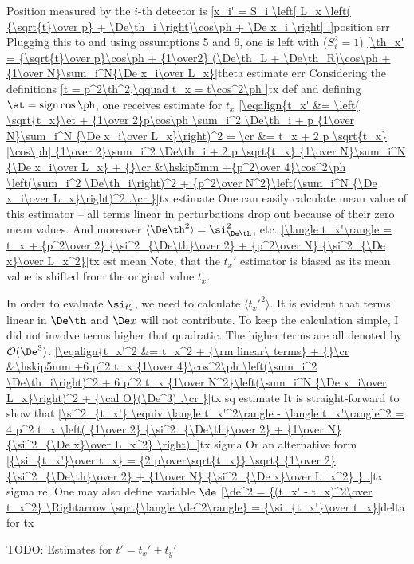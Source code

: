 Position measured by the $i$-th detector is
\eqref{x_i' = S_i \left[ L_x \left( {\sqrt{t}\over p} + \De\th_i \right)\cos\ph + \De x_i \right] .}{position err}
Plugging this to  and using assumptions 5 and 6, one is left with ($S_i^2 = 1$)
\eqref{\th_x' = {\sqrt{t}\over p}\cos\ph + {1\over2} (\De\th_L + \De\th_R)\cos\ph + {1\over N}\sum_i^N{\De x_i\over L_x}}{theta estimate err}
Considering the definitions
\eqref{t = p^2\th^2,\qquad t_x = t\cos^2\ph }{tx def}
and defining $\et = \mathop{\rm sign}\cos\ph$, one receives estimate for $t_x$
\eqref{\eqalign{t_x' &= \left( \sqrt{t_x}\et + {1\over 2}p\cos\ph \sum_i^2 \De\th_i + p {1\over N}\sum_i^N {\De x_i\over L_x}\right)^2 = \cr
&= t_x 
+ 2 p \sqrt{t_x} |\cos\ph| {1\over 2}\sum_i^2 \De\th_i + 2 p \sqrt{t_x} {1\over N}\sum_i^N {\De x_i\over L_x} + {}\cr
&\hskip5mm +{p^2\over 4}\cos^2\ph \left(\sum_i^2 \De\th_i\right)^2 + {p^2\over N^2}\left(\sum_i^N {\De x_i\over L_x}\right)^2 .\cr
}}{tx estimate}
\def\Exp#1{\langle #1\rangle}
One can easily calculate mean value of this estimator -- all terms linear in perturbations drop out because of their zero mean values. And moreover $\Exp{\De\th^2} = \si^2_{\De\th}$, etc.
\eqref{\Exp{t_x'} = t_x + {p^2\over 2} {\si^2_{\De\th}\over 2} + {p^2\over N} {\si^2_{\De x}\over L_x^2}}{tx est mean}
Note, that the $t_x'$ estimator is biased as its mean value is shifted from the original value $t_x$.

In order to evaluate $\si_{t_x'}$, we need to calculate $\Exp{t_x'^2}$. It is evident that terms linear in $\De\th$ and $\De x$ will not contribute. To keep the calculation simple, I did not involve terms higher that quadratic. The higher terms are all denoted by ${\cal O}(\De^3)$.
\eqref{\eqalign{t_x'^2 &= t_x^2 + {\rm linear\ terms} + {}\cr
&\hskip5mm 
+6 p^2 t_x {1\over 4}\cos^2\ph \left(\sum_i^2 \De\th_i\right)^2 + 6 p^2 t_x {1\over N^2}\left(\sum_i^N {\De x_i\over L_x}\right)^2 + {\cal O}(\De^3) .\cr
}}{tx sq estimate}
It is straight-forward to show that
\eqref{\si^2_{t_x'} \equiv \Exp{t_x'^2} - \Exp{t_x'}^2 = 4 p^2 t_x \left( {1\over 2} {\si^2_{\De\th}\over 2} + {1\over N} {\si^2_{\De x}\over L_x^2} \right) .}{tx sigma}
Or an alternative form
\eqref{{\si_{t_x'}\over t_x} = {2 p\over\sqrt{t_x}} \sqrt{ {1\over 2} {\si^2_{\De\th}\over 2} + {1\over N} {\si^2_{\De x}\over L_x^2} } .}{tx sigma rel}
One may also define variable $\de$
\eqref{\de^2 = {(t_x' - t_x)^2\over t_x^2} \Rightarrow \sqrt{\Exp{\de^2}} = {\si_{t_x'}\over t_x}}{delta for tx}

TODO: Estimates for $t' = t_x' + t_y'$





